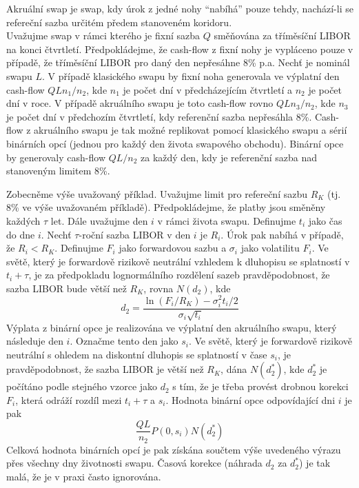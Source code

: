 \documentclass[a4paper]{book}
\begin{document}
Akruální swap je swap, kdy úrok z jedné nohy ``nabíhá'' pouze tehdy, nachází-li se refereční sazba určitém předem stanoveném koridoru.\\

Uvažujme swap v rámci kterého je fixní sazba $Q$ směňována za tříměsíční LIBOR na konci čtvrtletí. Předpokládejme, že cash-flow z fixní nohy je vypláceno pouze v případě, že tříměsíční LIBOR pro daný den nepřesáhne 8\% p.a. Nechť je nominál swapu $L$. V případě klasického swapu by fixní noha generovala ve výplatní den cash-flow $QLn_1/n_2$, kde $n_1$ je počet dní v předcházejícím čtvrtletí a $n_2$ je počet dní v roce. V případě akruálního swapu je toto cash-flow rovno $QLn_3/n_2$, kde $n_3$ je počet dní v předchozím čtvrtletí, kdy referenční sazba nepřesáhla 8\%. Cash-flow z akruálního swapu je tak možné replikovat pomocí klasického swapu a sérií binárních opcí (jednou pro každý den života swapového obchodu). Binární opce by generovaly cash-flow $QL/n_2$ za každý den, kdy je referenční sazba nad stanoveným limitem 8\%.

Zobecněme výše uvažovaný příklad. Uvažujme limit pro refereční sazbu $R_K$ (tj. 8\% ve výše uvažovaném příkladě). Předpokládejme, že platby jsou směněny každých $\tau$ let. Dále uvažujme den $i$ v rámci života swapu. Definujme $t_i$ jako čas do dne $i$. Nechť $\tau$-roční sazba LIBOR v den $i$ je $R_i$. Úrok pak nabíhá v případě, že $R_i < R_K$. Definujme $F_i$ jako forwardovou sazbu a $\sigma_i$ jako volatilitu $F_i$. Ve světě, který je forwardově rizikově neutrální vzhledem k dluhopisu se splatností v $t_i + \tau$, je za předpokladu lognormálního rozdělení sazeb pravděpodobnost, že sazba LIBOR bude větší než $R_K$, rovna $N(d_2)$, kde
\begin{equation*}
d_2 = \frac{\ln(F_i/R_K)-\sigma^2_i t_i/2}{\sigma_i \sqrt{t_i}}
\end{equation*}
Výplata z binární opce je realizována ve výplatní den akruálního swapu, který následuje den $i$. Označme tento den jako $s_i$. Ve světě, který je forwardově rizikově neutrální s ohledem na diskontní dluhopis se splatností v čase $s_i$, je pravděpodobnost, že sazba LIBOR je větší než $R_K$, dána $N(d^*_2)$, kde $d^*_2$ je počítáno podle stejného vzorce jako $d_2$ s tím, že je třeba provést drobnou korekci $F_i$, která odráží rozdíl mezi $t_i + \tau$ a $s_i$. Hodnota binární opce odpovídající dni $i$ je pak
\begin{equation*}
\frac{QL}{n_2}P(0,s_i)N(d^*_2)
\end{equation*}
Celková hodnota binárních opcí je pak získána součtem výše uvedeného výrazu přes všechny dny životnosti swapu. Časová korekce (náhrada $d_2$ za $d^*_2$) je tak malá, že je v praxi často ignorována.
\end{document}
